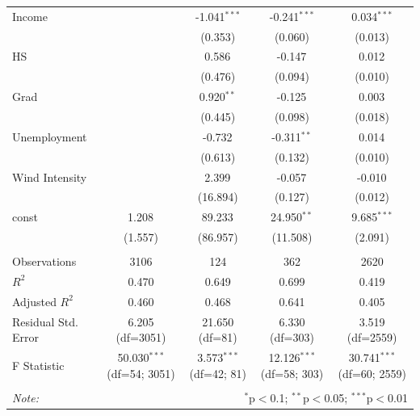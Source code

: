 \begin{table}[!htbp]
\begin{tabular}{@{\extracolsep{5pt}}lcccc}
 Income & & -1.041$^{***}$ & -0.241$^{***}$ & 0.034$^{***}$ \\
& & (0.353) & (0.060) & (0.013) \\
 HS & & 0.586$^{}$ & -0.147$^{}$ & 0.012$^{}$ \\
& & (0.476) & (0.094) & (0.010) \\
 Grad & & 0.920$^{**}$ & -0.125$^{}$ & 0.003$^{}$ \\
& & (0.445) & (0.098) & (0.018) \\
 Unemployment & & -0.732$^{}$ & -0.311$^{**}$ & 0.014$^{}$ \\
& & (0.613) & (0.132) & (0.010) \\
 Wind Intensity & & 2.399$^{}$ & -0.057$^{}$ & -0.010$^{}$ \\
& & (16.894) & (0.127) & (0.012) \\
 const & 1.208$^{}$ & 89.233$^{}$ & 24.950$^{**}$ & 9.685$^{***}$ \\
& (1.557) & (86.957) & (11.508) & (2.091) \\
\hline \\[-1.8ex]
 Observations & 3106 & 124 & 362 & 2620 \\
 $R^2$ & 0.470 & 0.649 & 0.699 & 0.419 \\
 Adjusted $R^2$ & 0.460 & 0.468 & 0.641 & 0.405 \\
 Residual Std. Error & 6.205 (df=3051) & 21.650 (df=81) & 6.330 (df=303) & 3.519 (df=2559) \\
 F Statistic & 50.030$^{***}$ (df=54; 3051) & 3.573$^{***}$ (df=42; 81) & 12.126$^{***}$ (df=58; 303) & 30.741$^{***}$ (df=60; 2559) \\
\hline
\hline \\[-1.8ex]
\textit{Note:} & \multicolumn{4}{r}{$^{*}$p$<$0.1; $^{**}$p$<$0.05; $^{***}$p$<$0.01} \\
\end{tabular}
\end{table}